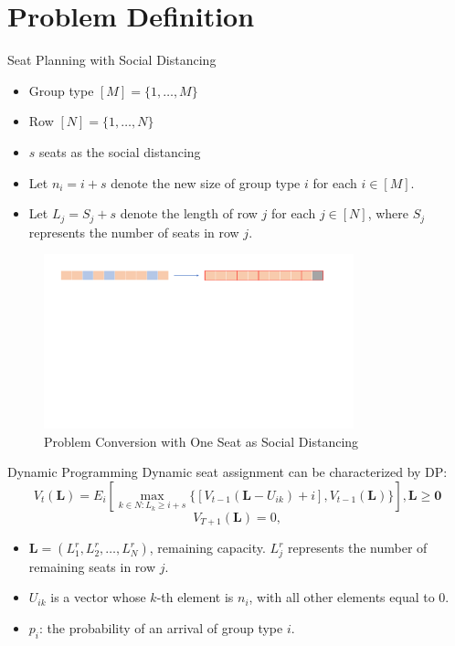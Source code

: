 
\section{Problem Definition}
    \frame{\sectionpage}

    \begin{frame}{Seat Planning with Social Distancing}
      \begin{itemize}
      \item Group type $[M] = \{1, \ldots, M\}$
      \item Row $[N] = \{1, \ldots, N\}$
      \item $s$ seats as the social distancing
      \item Let $n_i = i + s$ denote the new size of group type $i$ for each $i \in [M]$.
      \item Let $L_j = S_j + s$ denote the length of row $j$ for each $j \in [N]$, where $S_j$ represents the number of seats in row $j$.
      \end{itemize}
      
      \begin{figure}[ht]
        \centering
        \includegraphics[width = 0.8\textwidth]{./images/dummy_seat.pdf}
        \caption{Problem Conversion with One Seat as Social Distancing}
    \end{figure}
    \end{frame}

    \begin{frame}{Dynamic Programming}
      \centering
      Dynamic seat assignment can be characterized by DP:
      $$V_{t}(\mathbf{L}) = E_{i} \left[ \max_{k \in N: L_k \geq i + s} \{ {[V_{t-1}(\mathbf{L}- U_{ik})+ i]}, {V_{t-1}(\mathbf{L})}\} \right], \mathbf{L} \geq \mathbf{0}$$
      $$V_{T+1}(\mathbf{L}) = 0,$$

      \begin{itemize}
        \item $\mathbf{L} = (L^{r}_1, L^{r}_2, \ldots, L^{r}_{N})$, remaining capacity. $L^{r}_{j}$ represents the number of remaining seats in row $j$.
        \vspace{10pt}
        \item $U_{ik}$ is a vector whose $k$-th element is $n_i$, with all other elements equal to 0.
        \vspace{10pt}
        \item $p_i$: the probability of an arrival of group type $i$.
      \end{itemize}
  \end{frame}

